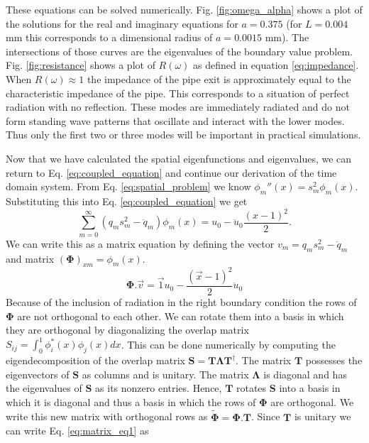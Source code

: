 \documentclass[superscriptaddress, onecolumn, prl]{revtex4}
\begin{document}
These equations can be solved numerically. Fig. \ref{fig:omega_alpha} shows a plot of the solutions for the real and imaginary equations for $a=0.375$ (for $L=0.004$ mm this corresponds to a dimensional radius of $a=0.0015$ mm). The intersections of those curves are the eigenvalues of the boundary value problem. Fig. \ref{fig:resistance} shows a plot of $R(\omega)$ as defined in equation \ref{eq:impedance}. When $R(\omega) \approx 1$ the impedance of the pipe exit is approximately equal to the characteristic impedance of the pipe. This corresponds to a situation of perfect radiation with no reflection. These modes are immediately radiated and do not form standing wave patterns that oscillate and interact with the lower modes. Thus only the first two or three modes will be important in practical simulations.

Now that we have calculated the spatial eigenfunctions and eigenvalues, we can return to Eq. \ref{eq:coupled_equation} and continue our derivation of the time domain system. From Eq. \ref{eq:spatial_problem} we know $\phi_m''(x)=s_m^2 \phi_m(x)$. Substituting this into Eq. \ref{eq:coupled_equation} we get
\begin{equation}
\label{eq:coupled_equation2}
\sum_{m=0}^\infty (q_m s_m^2 - \ddot{q}_m) \phi_m(x) = u_0 - \ddot{u}_0 \frac{(x-1)^2}{2}.
\end{equation}
We can write this as a matrix equation by defining the vector $v_m = q_m s_m^2 - \ddot{q}_m$ and matrix $ (\boldsymbol{\Phi})_{xm} = \phi_m(x)$.
\begin{equation}
\label{eq:matrix_eq1}
\boldsymbol{\Phi}.\vec{v} = \vec{1} u_0 - \frac{(\vec{x}-1)^2}{2} \ddot{u}_0
\end{equation}
Because of the inclusion of radiation in the right boundary condition the rows of $\boldsymbol{\Phi}$ are not orthogonal to each other. We can rotate them into a basis in which they are orthogonal by diagonalizing the overlap matrix $S_{ij} = \int_{0}^{1} \phi_i^*(x) \phi_j(x) dx$. This can be done numerically by computing the eigendecomposition of the overlap matrix $\boldsymbol{S}=\boldsymbol{T} \boldsymbol{\Lambda} \boldsymbol{T}^\dagger$. The matrix $\boldsymbol{T}$ possesses the eigenvectors of $\boldsymbol{S}$ as columns and is unitary. The matrix $\boldsymbol{\Lambda}$ is diagonal and has the eigenvalues of $\boldsymbol{S}$ as its nonzero entries. Hence, $\boldsymbol{T}$ rotates $\boldsymbol{S}$ into a basis in which it is diagonal and thus a basis in which the rows of $\boldsymbol{\Phi}$ are orthogonal. We write this new matrix with orthogonal rows as $\widetilde{\boldsymbol{\Phi}}=\boldsymbol{\Phi}.\boldsymbol{T}$. Since $\boldsymbol{T}$ is unitary we can write Eq. \ref{eq:matrix_eq1} as
\end{document}
